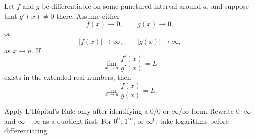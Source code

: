     \begin{theorem}
        Let $f$ and $g$ be differentiable on some punctured interval around $a$, and
        suppose that $g'(x)\neq 0$ there. Assume either
        \[
            f(x)\to 0,
            \qquad
            g(x)\to 0,
        \]
        or
        \[
            |f(x)|\to\infty,
            \qquad
            |g(x)|\to\infty,
        \]
        as $x\to a$. If
        \[
            \lim\limits_{x\to a}\frac{f'(x)}{g'(x)}=L
        \]
        exists in the extended real numbers, then
        \[
            \lim\limits_{x\to a}\frac{f(x)}{g(x)}=L.
        \]
    \end{theorem}

    \begin{strategy}
        Apply L'H\^opital's Rule only after identifying a $0/0$ or
        $\infty/\infty$ form. Rewrite $0\cdot\infty$ and $\infty-\infty$ as a
        quotient first. For $0^0$, $1^\infty$, or $\infty^0$, take logarithms
        before differentiating.
    \end{strategy}

